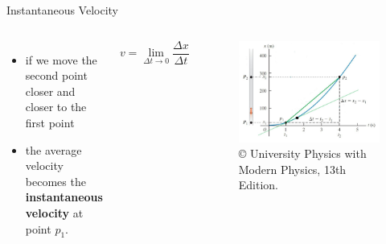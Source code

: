 \documentclass[]{beamer}
\begin{document}
\begin{frame}
Instantaneous Velocity
\vspace{3mm}
   \begin{columns}[c]
   \column{2in}  %
  
\begin{itemize}
\item  if we move the second point closer and closer to the first point
\item   the average velocity becomes the \textbf{instantaneous velocity} at point $p_1$.

\end{itemize}

\begin{equation*}
\boxed{v=\lim_{\Delta t\to0} \frac{\Delta x}{\Delta t}}
\end{equation*}


   \column{2.5in}
   
   \begin{figure}[h!]
 
  \includegraphics[width=1.\textwidth]{images/7.jpg}
   \caption{ {\tiny © University Physics 
   with Modern Physics, 13th Edition.} }
\end{figure}

   \end{columns}

 \end{frame}

\end{document}
